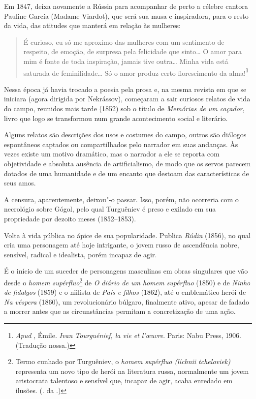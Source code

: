 Em 1847, deixa novamente a Rússia para acompanhar de perto a célebre
cantora Pauline García (Madame Viardot), que será sua musa e inspiradora, para o
resto da vida, das atitudes que manterá em relação às mulheres:

\begin{quotation}
É curioso, eu só me aproximo das mulheres com um sentimento de
respeito, de emoção, de surpresa pela felicidade que sinto\ldots{} O amor para
mim é fonte de toda inspiração, jamais tive outra\ldots{} Minha vida está
saturada de feminilidade\ldots{} Só o amor produz certo florescimento da
alma!\footnote{\emph{Apud} , Émile. \emph{Ivan Tourguénief, la vie et l'œuvre}.
Paris: Nabu Press, 1906. (Tradução nossa.)}
\end{quotation}

Nessa época já havia trocado a poesia pela prosa e, na mesma revista
em que se iniciara (agora dirigida por Nekrássov), começaram a sair curiosos relatos de vida do
campo, reunidos mais tarde (1852) sob o título de \emph{Memórias
de um caçador}, livro que logo se transformou num grande acontecimento social
e literário.

Alguns relatos são descrições dos usos e costumes do campo, outros são diálogos
espontâneos captados ou compartilhados pelo narrador em suas andanças.
Às vezes existe um motivo dramático, mas o narrador a ele se
reporta com objetividade e absoluta ausência de artificialismo, de modo
que os servos parecem dotados de uma humanidade e de um encanto
que destoam das características de seus amos.

A censura, aparentemente, deixou"-o passar. Isso, porém, não ocorreria com o necrológio
sobre Gógol, pelo qual Turguêniev é preso e exilado em sua propriedade
por dezoito meses (1852--1853).

Volta à vida pública no ápice de sua popularidade. Publica \emph{Rúdin} (1856), no qual cria uma personagem até hoje
intrigante, o jovem russo de ascendência nobre, sensível, radical e
idealista, porém incapaz de agir.

É o início de um suceder de personagens masculinas em obras
singulares que vão desde o \emph{homem supérfluo}\footnote{Termo cunhado por Turguêniev, o \emph{homem supérfluo
(líchnii tcheloviek)} representa um novo tipo de herói na
literatura russa, normalmente um jovem aristocrata talentoso e
sensível que, incapaz de agir, acaba enredado em ilusões.
(. da .)} de \emph{O diário de um
homem supérfluo} (1850) e de \emph{Ninho de fidalgos} (1859) e o niilista de
\emph{Pais e filhos} (1862), até o emblemático herói de \emph{Na véspera}
(1860), um revolucionário búlgaro, finalmente ativo, apesar de fadado a
morrer antes que as circunstâncias permitam a concretização de uma ação.

